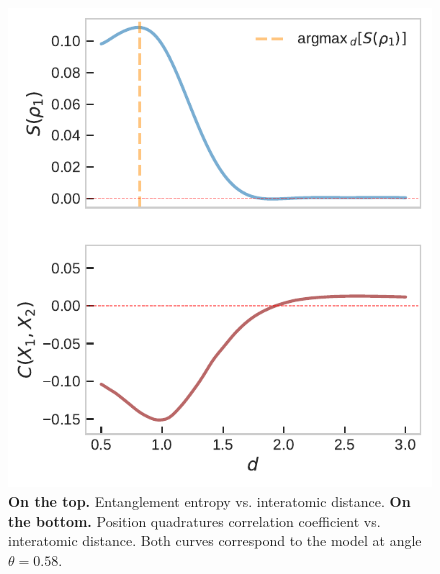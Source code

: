 \documentclass[reprint, amsmath, amssymb, floatfix, aps, pra]{revtex4-2}
\begin{document}
    \begin{figure}
        \includegraphics[scale=0.7]{figures/entropy_correlation.pdf}
    \caption{\label{fig:entropy_correlation2}\textbf{On the top.} Entanglement entropy vs. interatomic distance. \textbf{On the bottom.} Position quadratures correlation coefficient vs. interatomic distance. Both curves correspond to the model at angle $\theta=0.58$.}
    \end{figure}

\end{document}
